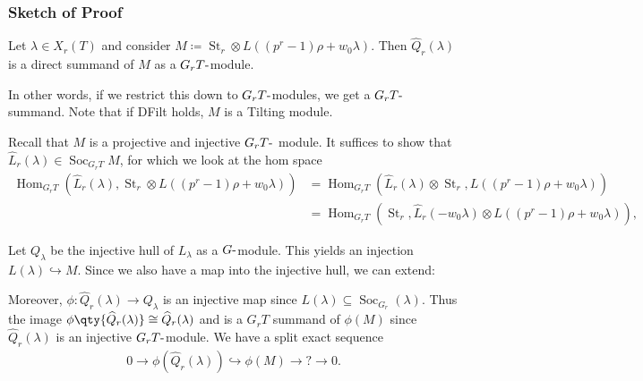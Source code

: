 \hypertarget{sketch-of-proof}{%
\subsubsection{Sketch of Proof}\label{sketch-of-proof}}

\begin{claim}

Let \(\lambda \in X_r(T)\) and consider
\(M \coloneqq\operatorname{St}_r \otimes L( (p^r-1)\rho + w_0 \lambda )\).
Then \(\widehat{Q}_r(\lambda)\) is a direct summand of \(M\) as a
\(G_r T{\hbox{-}}\)module.

\end{claim}

In other words, if we restrict this down to \(G_r T{\hbox{-}}\)modules,
we get a \(G_r T{\hbox{-}}\)summand. Note that if DFilt holds, \(M\) is
a Tilting module.

Recall that \(M\) is a projective and injective \(G_r T{\hbox{-}}\)
module. It suffices to show that
\(\widehat{L}_r(\lambda)\in \operatorname{Soc}_{G_r T} M\), for which we
look at the hom space
\begin{align*}  
{\operatorname{Hom}}_{G_r T} (\widehat{L}_r(\lambda), \operatorname{St}_r \otimes L( (p^r-1)\rho + w_0 \lambda ) )
&= {\operatorname{Hom}}_{G_r T} (\widehat{L}_r(\lambda) \otimes\operatorname{St}_r, L( (p^r-1)\rho + w_0 \lambda ) ) \\
&= {\operatorname{Hom}}_{G_r T} (\operatorname{St}_r, \widehat{L}_r(-w_0 \lambda) \otimes L( (p^r-1)\rho + w_0 \lambda ) ) 
,\end{align*}


Let \(Q_\lambda\) be the injective hull of \(L_\lambda\) as a
\(G{\hbox{-}}\)module. This yields an injection
\(L(\lambda)\hookrightarrow M\). Since we also have a map into the
injective hull, we can extend:

\begin{center}
\end{center}

Moreover, \(\phi:\widehat{Q}_r(\lambda)\to Q_\lambda\) is an injective
map since \(L(\lambda) \subseteq \operatorname{Soc}_{G_r}(\lambda)\).
Thus the image
\(\phi\qty{\widehat{Q}_r(\lambda) } \cong \widehat{Q}_r(\lambda)\) and
is a \(G_r T\) summand of \(\phi(M)\) since \(\widehat{Q}_r(\lambda)\)
is an injective \(G_r T{\hbox{-}}\)module. We have a split exact
sequence
\begin{align*}  
0 \to \phi(\widehat{Q}_r(\lambda)) \hookrightarrow\phi(M) \to ? \to 0
.\end{align*}

